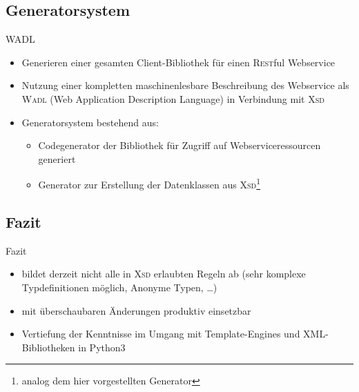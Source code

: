 \subsection{Generatorsystem}
\begin{frame}
    \begin{block}{WADL}
        \begin{itemize}
            \item Generieren einer gesamten Client-Bibliothek für einen \textsc{Rest}ful Webservice
            \item Nutzung einer kompletten maschinenlesbare Beschreibung des Webservice als \textsc{Wadl} (Web Application Description Language) in Verbindung mit \textsc{Xsd}
            \item Generatorsystem bestehend aus:
            \begin{itemize}
                \item Codegenerator der Bibliothek für Zugriff auf Webserviceressourcen generiert
                \item Generator zur Erstellung der Datenklassen aus \textsc{Xsd}\footnote{analog dem hier vorgestellten Generator}
            \end{itemize}
        \end{itemize}
    \end{block}
\end{frame}

\subsection{Fazit}
\begin{frame}{Fazit}
    \begin{itemize}
        \item bildet derzeit nicht alle in \textsc{Xsd} erlaubten Regeln ab (sehr komplexe Typdefinitionen möglich, Anonyme Typen, \ldots)
        \item mit überschaubaren Änderungen produktiv einsetzbar
        \item Vertiefung der Kenntnisse im Umgang mit Template-Engines und XML-Bibliotheken in Python3
    \end{itemize}
\end{frame}